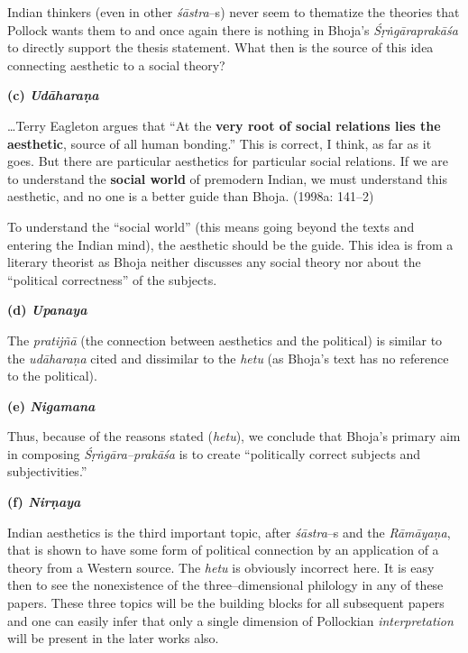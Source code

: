 Indian thinkers (even in other \textit{śāstra}–s) never seem to thematize the theories that Pollock wants them to and once again there is nothing in Bhoja’s \textit{Śṛṅgāraprakāśa} to directly support the thesis statement. What then is the source of this idea connecting aesthetic to a social theory?

\textbf{(c) \textit{Udāharaṇa}}

\begin{myquote}
…Terry Eagleton argues that “At the \textbf{very root of social relations lies the aesthetic}, source of all human bonding.” This is correct, I think, as far as it goes. But there are particular aesthetics for particular social relations. If we are to understand the \textbf{social world} of premodern Indian, we must understand this aesthetic, and no one is a better guide than Bhoja. (1998a: 141–2)
\end{myquote}

To understand the “social world” (this means going beyond the texts and entering the Indian mind), the aesthetic should be the guide. This idea is from a literary theorist as Bhoja neither discusses any social theory nor about the “political correctness” of the subjects.

\textbf{(d) \textit{Upanaya}}

The \textit{pratijñā} (the connection between aesthetics and the political) is similar to the \textit{udāharaṇa} cited and dissimilar to the \textit{hetu} (as Bhoja’s text has no reference to the political).

\textbf{(e) \textit{Nigamana}}

Thus, because of the reasons stated (\textit{hetu}), we conclude that Bhoja’s primary aim in composing \textit{Śṛṅgāra–prakāśa} is to create “politically correct subjects and subjectivities.”

\textbf{(f) \textit{Nirṇaya}}

Indian aesthetics is the third important topic, after \textit{śāstra}–s and the \textit{Rāmāyaṇa}, that is shown to have some form of political connection by an application of a theory from a Western source. The \textit{hetu} is obviously incorrect here. It is easy then to see the nonexistence of the three–dimensional philology in any of these papers. These three topics will be the building blocks for all subsequent papers and one can easily infer that only a single dimension of Pollockian \textit{interpretation} will be present in the later works also.

\vspace{-.3cm}

